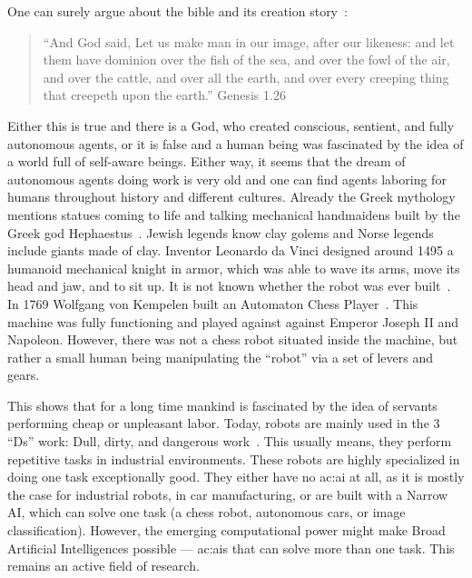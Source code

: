 One can surely argue about the bible and its creation story~\cite{james1611king}:

\begin{quote}
  ``And God said, Let us make man in our image, after our likeness: and let them have dominion over the fish of the sea, and over the fowl of the air, and over the cattle, and over all the earth, and over every creeping thing that creepeth upon the earth.''\vspace{0.5cm}
  Genesis 1.26
\end{quote}

Either this is true and there is a God, who created conscious, sentient, and fully autonomous agents, or it is false and a human being was fascinated by the idea of a world full of self-aware beings.
Either way, it seems that the dream of autonomous agents doing work is very old and one can find agents laboring for humans throughout history and different cultures.
Already the Greek mythology mentions statues coming to life and talking mechanical handmaidens built by the Greek god Hephaestus~\cite{gera2003ancient}.
Jewish legends know clay golems and Norse legends include giants made of clay.
Inventor Leonardo da Vinci designed around 1495 a humanoid mechanical knight in armor, which was able to wave its arms, move its head and jaw, and to sit up.
It is not known whether the robot was ever built~\cite{rosheim2006leonardo}.
In 1769 Wolfgang von Kempelen built an Automaton Chess Player~\cite{clark1999sciences}.
This machine was fully functioning and played against against Emperor Joseph II and Napoleon.
However, there was not a chess robot situated inside the machine, but rather a small human being manipulating the ``robot'' via a set of levers and gears.

This shows that for a long time mankind is fascinated by the idea of servants performing cheap or unpleasant labor.
Today, robots are mainly used in the 3 ``Ds'' work: Dull, dirty, and dangerous work~\cite{takayama2008beyond}.
This usually means, they perform repetitive tasks in industrial environments.
These robots are highly specialized in doing one task exceptionally good.
They either have no \gls{ac:ai} at all, as it is mostly the case for industrial robots, \eg in car manufacturing, or are built with a Narrow AI, which can solve one task (\eg a chess robot, autonomous cars, or image classification).
However, the emerging computational power might make Broad Artificial Intelligences possible --- \glspl{ac:ai} that can solve more than one task.
This remains an active field of research.


